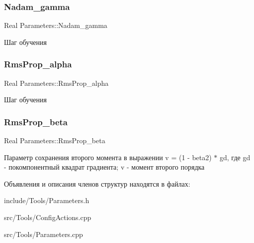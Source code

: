 \subsubsection{\texorpdfstring{Nadam\+\_\+gamma}{Nadam\_gamma}}
{\footnotesize\ttfamily Real Parameters\+::\+Nadam\+\_\+gamma\hspace{0.3cm}{\ttfamily [static]}}

Шаг обучения \mbox{\label{structParameters_ac50274e2816fd25aeee99e23891c5b2e}} 
\subsubsection{\texorpdfstring{Rms\+Prop\+\_\+alpha}{RmsProp\_alpha}}
{\footnotesize\ttfamily Real Parameters\+::\+Rms\+Prop\+\_\+alpha\hspace{0.3cm}{\ttfamily [static]}}

Шаг обучения \mbox{\label{structParameters_accecb0c309434afde3b2ae24e90a5740}} 
\subsubsection{\texorpdfstring{Rms\+Prop\+\_\+beta}{RmsProp\_beta}}
{\footnotesize\ttfamily Real Parameters\+::\+Rms\+Prop\+\_\+beta\hspace{0.3cm}{\ttfamily [static]}}

Параметр сохранения второго момента в выражении v = (1 -\/ beta2) $\ast$ gd, где gd -\/ покомпонентный квадрат градиента; v -\/ момент второго порядка 

Объявления и описания членов структур находятся в файлах\+:\begin{DoxyCompactItemize}
\item 
include/\+Tools/Parameters.\+h\item 
src/\+Tools/Config\+Actions.\+cpp\item 
src/\+Tools/Parameters.\+cpp\end{DoxyCompactItemize}
